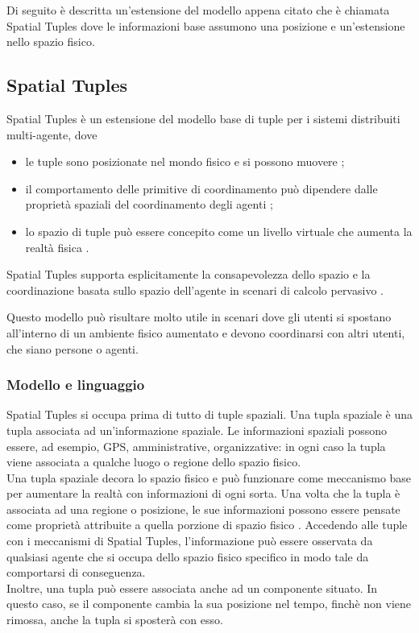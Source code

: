 Di seguito è descritta un'estensione del modello appena citato che è chiamata Spatial Tuples dove le informazioni base assumono una posizione e un'estensione nello spazio fisico.

\subsection{Spatial Tuples}
Spatial Tuples è un estensione del modello base di tuple per i sistemi distribuiti multi-agente, dove
\begin{itemize}
\item le tuple sono posizionate nel mondo fisico e si possono muovere \cite{SpatialTuples};
\item il comportamento delle primitive di coordinamento può dipendere dalle proprietà spaziali del coordinamento degli agenti \cite{SpatialTuples};
\item lo spazio di tuple può essere concepito come un livello virtuale che aumenta la realtà fisica \cite{SpatialTuples}.
\end{itemize}
Spatial Tuples supporta esplicitamente la consapevolezza dello spazio e la coordinazione basata sullo spazio dell'agente in scenari di calcolo pervasivo \cite{SpatialTuples}.

Questo modello può risultare molto utile in scenari dove gli utenti si spostano all'interno di un ambiente fisico aumentato e devono coordinarsi con altri utenti, che siano persone o agenti.

\subsubsection{Modello e linguaggio}
Spatial Tuples si occupa prima di tutto di tuple spaziali. Una tupla spaziale è una tupla associata ad un'informazione spaziale. Le informazioni spaziali possono essere, ad esempio, GPS, amministrative, organizzative: in ogni caso la tupla viene associata a qualche luogo o regione dello spazio fisico.
\\
Una tupla spaziale decora lo spazio fisico e può funzionare come meccanismo base per aumentare la realtà con informazioni di ogni sorta. Una volta che la tupla è associata ad una regione o posizione, le sue informazioni possono essere pensate come proprietà attribuite a quella porzione di spazio fisico \cite{SpatialTuples}. Accedendo alle tuple con i meccanismi di Spatial Tuples, l'informazione può essere osservata da qualsiasi agente che si occupa dello spazio fisico specifico in modo tale da comportarsi di conseguenza.
\\
Inoltre, una tupla può essere associata anche ad un componente situato. In questo caso, se il componente cambia la sua posizione nel tempo, finchè non viene rimossa, anche la tupla si sposterà con esso.

